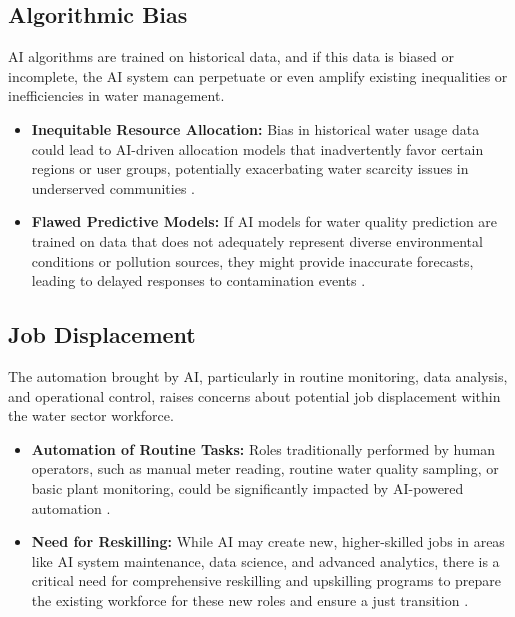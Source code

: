 \subsection{Algorithmic Bias}
AI algorithms are trained on historical data, and if this data is biased or incomplete, the AI system can perpetuate or even amplify existing inequalities or inefficiencies in water management.
\begin{itemize}
    \item \textbf{Inequitable Resource Allocation:} Bias in historical water usage data could lead to AI-driven allocation models that inadvertently favor certain regions or user groups, potentially exacerbating water scarcity issues in underserved communities \cite{UNESCO_Risks}.
    \item \textbf{Flawed Predictive Models:} If AI models for water quality prediction are trained on data that does not adequately represent diverse environmental conditions or pollution sources, they might provide inaccurate forecasts, leading to delayed responses to contamination events \cite{MDPI_Risks_WaterQuality}.
\end{itemize}

\subsection{Job Displacement}
The automation brought by AI, particularly in routine monitoring, data analysis, and operational control, raises concerns about potential job displacement within the water sector workforce.
\begin{itemize}
    \item \textbf{Automation of Routine Tasks:} Roles traditionally performed by human operators, such as manual meter reading, routine water quality sampling, or basic plant monitoring, could be significantly impacted by AI-powered automation \cite{MDPI_Risks_Job}.
    \item \textbf{Need for Reskilling:} While AI may create new, higher-skilled jobs in areas like AI system maintenance, data science, and advanced analytics, there is a critical need for comprehensive reskilling and upskilling programs to prepare the existing workforce for these new roles and ensure a just transition \cite{MDPI_Risks_Job}.
\end{itemize}


